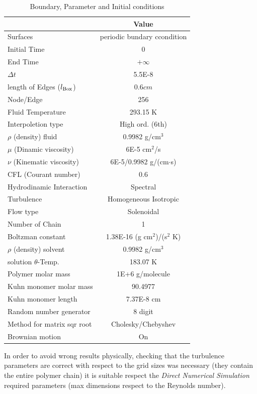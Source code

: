 \begin{table}[h]
\centering
\caption{Boundary, Parameter and Initial conditions}
\label{value}
\begin{tabular}{lc}
\toprule
\textbf{\color{blue}{Boundary/Parameter}} &\textbf{Value}  \\
\midrule
Surfaces & periodic bundary ccondition  \\
Initial Time & 0 \\ 
End Time &  $+\infty$ \\
$\Delta t$ & 5.5E-8\\
length of Edges ($l_{\small{\text{Box}}}$) &   0.6$cm$   \\ 
Node/Edge  & 256\\
Fluid Temperature  & 293.15 K\\
Interpoletion type & High ord. (6th) \\
$\rho$ (density) fluid & 0.9982 g/cm$^3$   \\
$\mu$ (Dinamic viscosity)  & 6E-5 cm$^2$/s  \\
$\nu$ (Kinematic viscosity)  & 6E-5/0.9982 g/(cm$\cdot$s) \\
CFL (Courant number)   & 0.6 \\
Hydrodinamic Interaction & Spectral \\
Turbulence               & Homogeneous Isotropic \\
Flow type               & Solenoidal  \\
Number of Chain          &     1  \\
Boltzman constant        & 1.38E-16 (g cm$^2$)/(s$^2$ K) \\
$\rho$ (density) solvent & 0.9982 g/cm$^3$        \\ 
solution $\theta$-Temp.  & 183.07 K \\
Polymer molar mass       & 1E+6 g/molecule    \\
Kuhn monomer molar mass  & 90.4977  \\
Kuhn monomer length      & 7.37E-8 cm \\
Random number generator  & 8 digit \\
Method for matrix sqr root & Cholesky/Chebyshev \\
Brownian motion           & On \\   
\bottomrule
\end{tabular}
\end{table}


In order to avoid wrong results physically, checking that the turbulence parameters are correct with respect to the 
grid sizes was necessary (they contain the entire polymer chain) it is suitable respect the \textit{Direct Numerical Simulation}
required parameters (max dimensions respect to the Reynolds number). 

